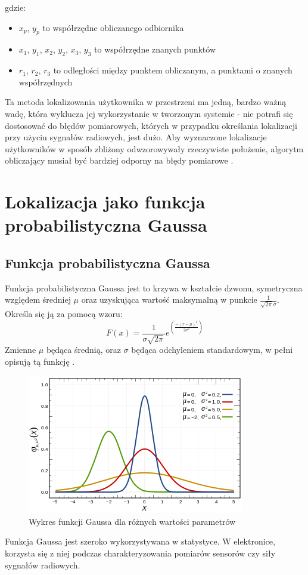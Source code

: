 gdzie:
\begin{itemize}
	\item $x_p$, $y_p$ to współrzędne obliczanego odbiornika
	\item $x_1$, $y_1$, $x_2$, $y_2$, $x_3$, $y_3$ to współrzędne znanych punktów
	\item $r_1$, $r_2$, $r_3$ to odległości między punktem obliczanym, a punktami o znanych współrzędnych
\end{itemize}
Ta metoda lokalizowania użytkownika w przestrzeni ma jedną, bardzo ważną wadę, która wyklucza jej wykorzystanie w tworzonym systemie - nie potrafi się dostosować do błędów pomiarowych, których w przypadku określania lokalizacji przy użyciu sygnałów radiowych, jest dużo. Aby wyznaczone lokalizacje użytkowników w sposób zbliżony odwzorowywały rzeczywiste położenie, algorytm obliczający musiał być bardziej odporny na błędy pomiarowe \cite{MT}.
\section{Lokalizacja jako funkcja probabilistyczna Gaussa}
\subsection{Funkcja probabilistyczna Gaussa}
Funkcja probabilistyczna Gaussa jest to krzywa w kształcie dzwonu, symetryczna względem średniej $\mu$ oraz uzyskująca wartość maksymalną w punkcie $\frac{1}{\sqrt{2\pi}\sigma}$.
Określa się ją za pomocą wzoru:
\begin{equation}
F(x) = \frac{1}{\sigma\sqrt{2\pi}}e^{\left(\frac{-(x-\mu)^2}{2\sigma^2}\right)}
\end{equation}
Zmienne $\mu$ będąca średnią, oraz $\sigma$ będąca odchyleniem standardowym, w pełni opisują tą funkcję \cite{MIR}.
\begin{figure}[H]			
	\centering
	\caption{Wykres funkcji Gaussa dla różnych wartości parametrów}
	\includegraphics{funkcja_Gaussa}
\end{figure}
Funkcja Gaussa jest szeroko wykorzystywana w statystyce. W elektronice, korzysta się z niej podczas charakteryzowania pomiarów sensorów czy siły sygnałów radiowych.
